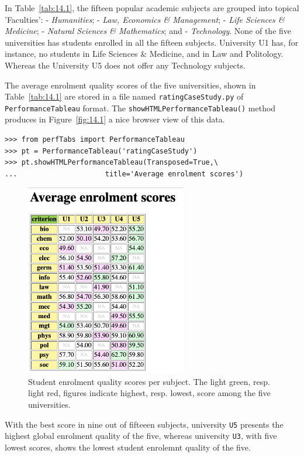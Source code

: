 In Table~\vref{tab:14.1}, the fifteen popular academic subjects are grouped into topical 'Faculties': - \emph{Humanities}; - \emph{Law, Economics \& Management}; - \emph{Life Sciences \& Medicine}; - \emph{Natural Sciences \& Mathematics}; and - \emph{Technology}. None of the five universities has students enrolled in all the fifteen subjects. University U1 has, for instance, no students in Life Sciences \& Medicine, and in Law and Politology. Whereas the University U5 does not offer any Technology subjects.

The average enrolment quality scores of the five universities, shown in Table~\vref{tab:14.1} are stored in a file named \texttt{ratingCaseStudy.py} of \texttt{PerformanceTableau} format. The \texttt{showHTMLPerformanceTableau()}  method produces in Figure~\vref{fig:14.1} a nice browser view of this data. 
\begin{lstlisting}
>>> from perfTabs import PerformanceTableau
>>> pt = PerformanceTableau('ratingCaseStudy')
>>> pt.showHTMLPerformanceTableau(Transposed=True,\
...                     title='Average enrolment scores')
\end{lstlisting}
\begin{figure}[ht]
\sidecaption[t]
\includegraphics[width=7cm]{Figures/14-1-enrolmentScores.png}
\caption{Student enrolment quality scores per subject. The light green, resp. light red, figures indicate highest, resp. lowest, score among the five universities.}
\label{fig:14.1}       %
\end{figure}

With the best score in nine out of fifteeen subjects, university \texttt{U5} presents the highest global enrolment quality of the five, whereas university \texttt{U3}, with five lowest scores, shows the lowest student enrolemnt quality of the five.

